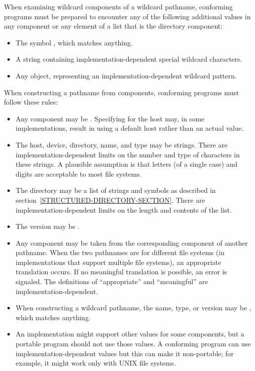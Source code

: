 \begin{newer}
  When examining wildcard components of a wildcard pathname, conforming programs
  must be prepared to encounter any of the following additional values
  in any component or any element of a list that is the directory component:
  \begin{itemize}
    \item The symbol , which matches anything.

   \item  A string containing implementation-dependent special wildcard
    characters.

    \item  Any object, representing an implementation-dependent wildcard pattern.
  \end{itemize}

  When constructing a pathname from components, conforming programs
  must follow these rules:
  \begin{itemize}
    \item  Any component may be .  Specifying  for the host may,
     in some implementations,
    result in using a default host
    rather than an actual  value.
    
    \item  The host, device, directory, name, and type may be strings.  There
    are implementation-dependent limits on the number and type of
    characters in these strings.  A plausible assumption is that letters (of a single case)
    and digits are acceptable to most file systems.
  
    \item  The directory may be a list of strings and symbols as described in
    section~\ref{STRUCTURED-DIRECTORY-SECTION}.  There are
    implementation-dependent limits on the length and contents of the list.
  
   \item  The version may be .

    \item  Any component may be taken from the corresponding component
    of another pathname.  When the two pathnames are for different
    file systems (in implementations that support multiple file
    systems), an appropriate translation occurs.  If no meaningful
    translation is possible, an error is signaled.  The definitions
    of ``appropriate'' and ``meaningful'' are implementation-dependent.
  
    \item  When constructing a wildcard pathname, the name, type, or version
    may be , which matches anything.
  
   \item  An implementation might support other values for some components,
    but a portable program should not use those values.  A conforming program
    can use implementation-dependent values but this can make it
    non-portable; for example, it might work only with UNIX file systems.
   \end{itemize}
\end{newer}

